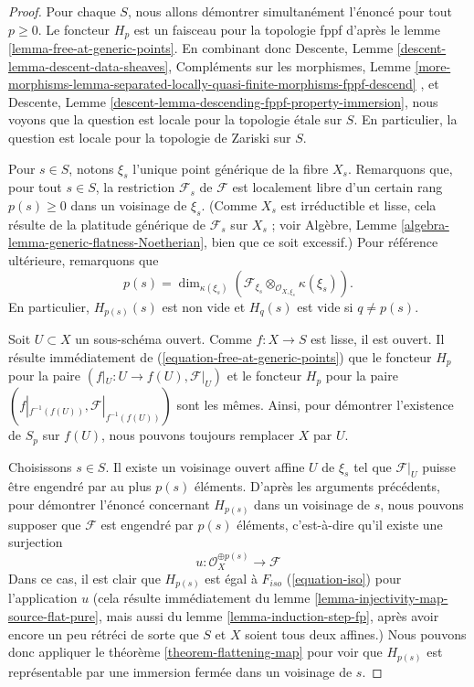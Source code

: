 \begin{proof}
Pour chaque $S$, nous allons démontrer simultanément l'énoncé pour tout $p \geq 0$.
Le foncteur $H_p$ est un faisceau pour la topologie fppf d'après le
lemme \ref{lemma-free-at-generic-points}.
En combinant donc
Descente, Lemme \ref{descent-lemma-descent-data-sheaves},
Compléments sur les morphismes, Lemme
\ref{more-morphisms-lemma-separated-locally-quasi-finite-morphisms-fppf-descend}
, et
Descente, Lemme \ref{descent-lemma-descending-fppf-property-immersion},
nous voyons que la question est locale pour la topologie \'etale sur $S$.
En particulier, la question est locale pour la topologie de Zariski sur $S$.

\medskip\noindent
Pour $s \in S$, notons $\xi_s$ l'unique point générique de la fibre $X_s$.
Remarquons que, pour tout $s \in S$, la restriction $\mathcal{F}_s$ de
$\mathcal{F}$ est localement libre d'un certain rang $p(s) \geq 0$ dans un
voisinage de $\xi_s$. (Comme $X_s$ est irréductible
et lisse, cela résulte de la platitude générique de $\mathcal{F}_s$ sur
$X_s$ ; voir
Algèbre, Lemme \ref{algebra-lemma-generic-flatness-Noetherian},
bien que ce soit excessif.) Pour référence ultérieure, remarquons que
$$
p(s) =
\dim_{\kappa(\xi_s)}(
\mathcal{F}_{\xi_s} \otimes_{\mathcal{O}_{X, \xi_s}} \kappa(\xi_s)
).
$$
En particulier, $H_{p(s)}(s)$ est non vide et $H_q(s)$ est vide
si $q \not = p(s)$.

\medskip\noindent
Soit $U \subset X$ un sous-schéma ouvert.
Comme $f : X \to S$ est lisse, il est ouvert.
Il résulte immédiatement de (\ref{equation-free-at-generic-points})
que le foncteur $H_p$ pour la paire $(f|_U : U \to f(U), \mathcal{F}|_U)$
et le foncteur $H_p$ pour la paire
$(f|_{f^{-1}(f(U))}, \mathcal{F}|_{f^{-1}(f(U))})$
sont les mêmes. Ainsi, pour démontrer l'existence de $S_p$ sur $f(U)$, nous pouvons
toujours remplacer $X$ par $U$.

\medskip\noindent
Choisissons $s \in S$. Il existe un voisinage ouvert affine $U$
de $\xi_s$ tel que $\mathcal{F}|_U$ puisse être engendré par au plus
$p(s)$ éléments. D'après les arguments précédents, pour démontrer
l'énoncé concernant $H_{p(s)}$ dans un voisinage de $s$, nous pouvons supposer
que $\mathcal{F}$ est engendré par $p(s)$ éléments, c'est-à-dire qu'il existe
une surjection
$$
u : \mathcal{O}_X^{\oplus p(s)} \longrightarrow \mathcal{F}
$$
Dans ce cas, il est clair que $H_{p(s)}$ est égal à $F_{iso}$
(\ref{equation-iso}) pour l'application $u$ (cela résulte immédiatement du
lemme \ref{lemma-injectivity-map-source-flat-pure},
mais aussi du
lemme \ref{lemma-induction-step-fp},
après avoir encore un peu rétréci de sorte que $S$ et $X$ soient tous deux affines.)
Nous pouvons donc appliquer le
théorème \ref{theorem-flattening-map}
pour voir que $H_{p(s)}$ est représentable par une immersion fermée dans un
voisinage de $s$.


\end{proof}
